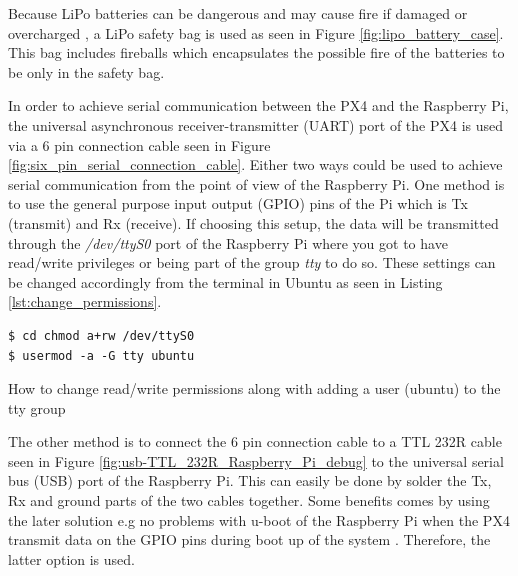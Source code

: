 \documentclass[../Head/report.tex]{subfiles}
\begin{document}
Because LiPo batteries can be dangerous and may cause fire if damaged or overcharged \cite{lipoBatteryGuide}, a LiPo safety bag is used as seen in Figure \ref{fig:lipo_battery_case}. This bag includes fireballs which encapsulates the possible fire of the batteries to be only in the safety bag. 

In order to achieve serial communication between the PX4 and the Raspberry Pi, the universal asynchronous receiver-transmitter (UART) port of the PX4 is used via a 6 pin connection cable seen in Figure \ref{fig:six_pin_serial_connection_cable}. Either two ways could be used to achieve serial communication from the point of view of the Raspberry Pi. One method is to use the general purpose input output (GPIO) pins of the Pi which is Tx (transmit) and Rx (receive). If choosing this setup, the data will be transmitted through the \textit{/dev/ttyS0} port of the Raspberry Pi where you got to have read/write privileges or being part of the group \textit{tty} to do so. These settings can be changed accordingly from the terminal in Ubuntu as seen in Listing \ref{lst:change_permissions}. 

\begin{listing}[H] 
\begin{tcolorbox}[
    enhanced,
    attach boxed title to top left={xshift=6mm,yshift=-3mm},
    colback=lightgreen!20,
    colframe=lightgreen,
    fonttitle=\bfseries\color{black},
]
\begin{verbatim}
$ cd chmod a+rw /dev/ttyS0
$ usermod -a -G tty ubuntu
\end{verbatim}
\end{tcolorbox}
\caption{How to change read/write permissions along with adding a user (ubuntu) to the tty group}
\label{lst:change_permissions}    
\end{listing} 

The other method is to connect the 6 pin connection cable to a TTL 232R cable seen in Figure \ref{fig:usb-TTL_232R_Raspberry_Pi_debug} to the universal serial bus (USB) port of the Raspberry Pi. This can easily be done by solder the Tx, Rx and ground parts of the two cables together. Some benefits comes by using the later solution e.g no problems with u-boot of the Raspberry Pi when the PX4 transmit data on the GPIO pins during boot up of the system  \cite{uBoot}. Therefore, the latter option is used.
\end{document}
